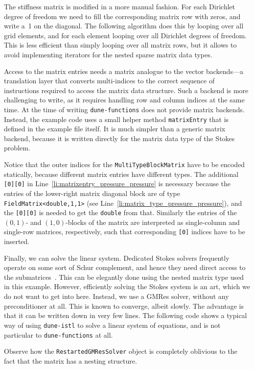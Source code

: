 \documentclass[a4paper,10pt,headings=normal,bibliography=totoc]{scrartcl}
\newcommand{\cpp}[1]{\lstinline[basicstyle=\ttfamily]!#1!}
\newcommand{\dunemodule}[1]{\texttt{#1}}
\begin{document}
The stiffness matrix is modified in a more manual fashion.  For each Dirichlet degree of freedom we need to fill the corresponding matrix row
with zeros, and write a~1 on the diagonal.
The following algorithm does this by looping over all grid elements, and for each element
looping over all Dirichlet degrees of freedom.  This is less efficient than simply
looping over all matrix rows, but it allows to avoid implementing iterators for the
nested sparse matrix data types.
%

%
Access to the matrix entries needs a matrix analogue to the vector backends---a translation
layer that converts multi-indices to the correct sequence of instructions required to
access the matrix data structure.  Such a backend is more challenging to write, as it
requires handling row and column indices at the same time.  At the time of writing \dunemodule{dune-functions}
does not provide matrix backends.  Instead, the example code uses a small helper method
\cpp{matrixEntry} that is defined in the example file itself.
It is much simpler than a generic matrix backend, because it is written
directly for the matrix data type of the Stokes problem.
%

%
Notice that the outer indices for the \cpp{MultiTypeBlockMatrix} have to be
encoded statically, because different matrix entries have different types.
The additional \cpp{[0][0]} in Line~\ref{li:matrixentry_pressure_pressure} is necessary
because the entries of the lower-right matrix diagonal block are of type \cpp{FieldMatrix<double,1,1>}
(see Line~\ref{li:matrix_type_pressure_pressure}), and the \cpp{[0][0]} is needed to get the \cpp{double} from that.
Similarly the entries of the $(0,1)$- and $(1,0)$-blocks of the matrix are
interpreted as single-column and single-row matrices, respectively, such that
corresponding \cpp{[0]} indices have to be inserted.

Finally, we can solve the linear system.
Dedicated Stokes solvers frequently operate on some sort of Schur complement,
and hence they need direct access to the submatrices~\cite{john:2016}.
This can be elegantly done using the nested matrix type used in this example.
However, efficiently solving the Stokes system is an art,
which we do not want to get into here.
Instead, we use a GMRes solver, without any preconditioner at all.  This is known to converge,
albeit slowly.
The advantage is that it can be written down in very few lines.
The following code shows a typical way of using \dunemodule{dune-istl} to solve
a linear system of equations, and is not particular to \dunemodule{dune-functions}
at all.
%

%
Observe how the \cpp{RestartedGMResSolver} object is completely oblivious to the fact that the matrix
has a nesting structure.
\end{document}
